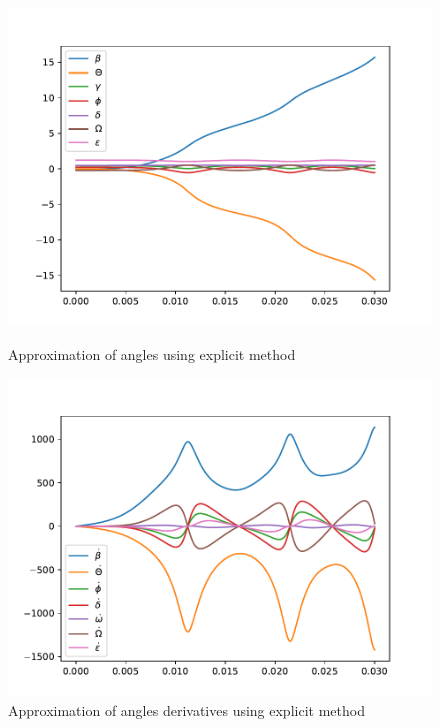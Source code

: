 \documentclass{report}
\begin{document}
\begin{figure}[h]
\begin{minipage}[t]{0.45\textwidth}
\centering
\includegraphics[width=\textwidth]{../Plots/RK4_Proj2/angles}
\caption{Approximation of angles using explicit method}
\label{pl:explicit_angles}
\end{minipage}
\hfill
\begin{minipage}[t]{0.45\textwidth}
\centering
\includegraphics[width=\textwidth]{../Plots/RK4_Proj2/derivatives}
\caption{Approximation of angles derivatives using explicit method}
\label{pl:explicit_angles_dot}
\end{minipage}
\end{figure}
\end{document}
